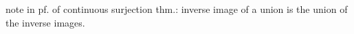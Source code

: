 note in pf. of continuous surjection thm.: inverse image of a union is the union of the inverse images.